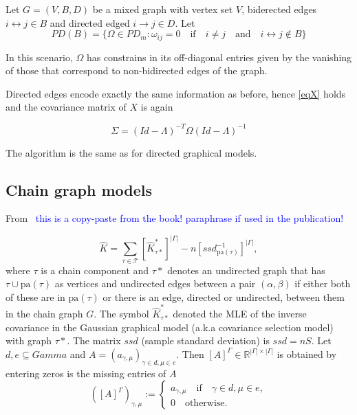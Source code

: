\documentclass[10pt,a4paper]{article}
\begin{document}
Let $G=(V,B,D)$ be a mixed graph with vertex set $V$, biderected edges $i \leftrightarrow j \in B$ and directed edged $i \rightarrow j \in D$. Let 
\[PD(B) = \{ \Omega \in PD_m : \omega_{ij} = 0 \quad \text{if} \quad i \neq j\quad \text{and} \quad i \leftrightarrow j \notin B\}\]

In this scenario, $\Omega$ has constrains in its off-diagonal entries given by the vanishing of those that correspond to non-bidirected edges of the graph. 

Directed edges encode exactly the same information as before, hence {\ref{eqX}} holds and
the covariance matrix of $X$ is again

$$\Sigma=(Id-\Lambda)^{-T}\Omega(Id-\Lambda)^{-1}$$

The algorithm is the same as for directed graphical models.


\subsection{Chain graph models}
From~\cite[Section 5.4.1]{lauritzen1996graphical} \textcolor{blue}{this is a copy-paste from the book! paraphrase if used in the publication!}

\begin{equation}
\hat{K}=\sum\limits_{\tau \in \mathcal{T}}[\hat{K}^*_{\tau*}]^{|\Gamma|}-n[ssd_{\text{pa}(\tau)}^{-1}]^{|\Gamma|},
\end{equation}
where $\tau$ is a chain component and $\tau*$ denotes an undirected graph that has $\tau \cup \text{pa}(\tau)$ as vertices and undirected edges between a pair $(\alpha,\beta)$ if either both of these are in $\text{pa}(\tau)$ or there is an edge, directed or undirected, between them in the chain graph $G$. The symbol $\hat{K}^*_{\tau*}$ denoted the MLE of the inverse covariance in the Gaussian graphical model (a.k.a  covariance selection model) with graph $\tau*$. The matrix $ssd$ (sample standard deviation) is $ssd=nS$.
Let $d,e\subseteq Gamma$ and $A=(a_{\gamma,\mu})_{\gamma \in d, \mu \in e}$. Then $[A]^\Gamma \in \mathbb{R}^{|\Gamma|\times |\Gamma|}$ is obtained by entering zeros is the missing entries of $A$
\[
([A]^\Gamma)_{\gamma,\mu}:=
\begin{cases}
a_{\gamma,\mu} \quad \text{if} \quad \gamma \in d, \mu \in e,\\
0 \quad \text{otherwise.}
\end{cases}
\] 


\end{document}
